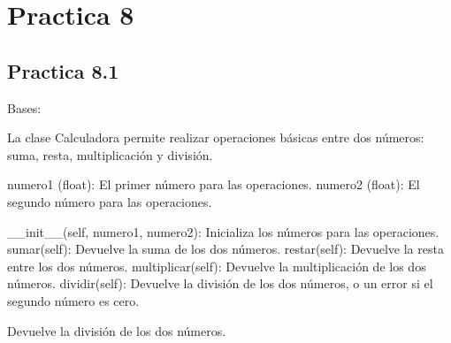 \documentclass[letterpaper,10pt,spanish]{sphinxmanual}
\begin{document}
\sphinxstepscope


\chapter{Practica 8}
\label{\detokenize{pr8:practica-8}}\label{\detokenize{pr8::doc}}

\section{Practica 8.1}
\label{\detokenize{pr8:module-pr8.1}}\label{\detokenize{pr8:practica-8-1}}

\begin{fulllineitems}
\label{\detokenize{pr8:pr8.1.Calculadora}}
\pysigstartsignatures
{}
\pysigstopsignatures
\sphinxAtStartPar
Bases: 

\sphinxAtStartPar
La clase Calculadora permite realizar operaciones básicas entre dos números: suma, resta, multiplicación y división.
\begin{description}
\sphinxAtStartPar
numero1 (float): El primer número para las operaciones.
numero2 (float): El segundo número para las operaciones.

\sphinxAtStartPar
\_\_init\_\_(self, numero1, numero2): Inicializa los números para las operaciones.
sumar(self): Devuelve la suma de los dos números.
restar(self): Devuelve la resta entre los dos números.
multiplicar(self): Devuelve la multiplicación de los dos números.
dividir(self): Devuelve la división de los dos números, o un error si el segundo número es cero.

\end{description}

\begin{fulllineitems}
\label{\detokenize{pr8:pr8.1.Calculadora.dividir}}
\pysigstartsignatures
{}
\pysigstopsignatures
\sphinxAtStartPar
Devuelve la división de los dos números.


\end{fulllineitems}
\end{fulllineitems}
\end{document}
